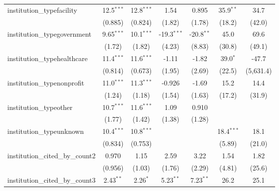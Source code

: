 \begin{tabular}{lcccccc}
   institution\_typefacility             & 12.5$^{***}$  & 12.8$^{***}$  & 1.54          & 0.895         & 35.9$^{**}$   & 34.7\\   
                                         & (0.885)       & (0.824)       & (1.82)        & (1.78)        & (18.2)        & (42.0)\\   
   institution\_typegovernment           & 9.65$^{***}$  & 10.1$^{***}$  & -19.3$^{***}$ & -20.8$^{**}$  & 45.0          & 69.6\\   
                                         & (1.72)        & (1.82)        & (4.23)        & (8.83)        & (30.8)        & (49.1)\\   
   institution\_typehealthcare           & 11.4$^{***}$  & 11.6$^{***}$  & -1.11         & -1.82         & 39.0$^{*}$    & -47.7\\   
                                         & (0.814)       & (0.673)       & (1.95)        & (2.69)        & (22.5)        & (5,631.4)\\   
   institution\_typenonprofit            & 11.0$^{***}$  & 11.3$^{***}$  & -0.926        & -1.69         & 15.2          & 14.4\\   
                                         & (1.24)        & (1.18)        & (1.54)        & (1.63)        & (17.2)        & (31.9)\\   
   institution\_typeother                & 10.7$^{***}$  & 11.6$^{***}$  & 1.09          & 0.910         &               &   \\   
                                         & (1.77)        & (1.42)        & (1.38)        & (1.28)        &               &   \\   
   institution\_typeunknown              & 10.4$^{***}$  & 10.8$^{***}$  &               &               & 18.4$^{***}$  & 18.1\\   
                                         & (0.834)       & (0.753)       &               &               & (5.89)        & (21.0)\\   
   institution\_cited\_by\_count2        & 0.970         & 1.15          & 2.59          & 3.22          & 1.54          & 1.82\\   
                                         & (0.956)       & (1.03)        & (1.76)        & (2.29)        & (4.81)        & (25.6)\\   
   institution\_cited\_by\_count3        & 2.43$^{**}$   & 2.26$^{*}$    & 5.23$^{**}$   & 7.23$^{**}$   & 26.2          & 25.1\\   

\end{tabular}
